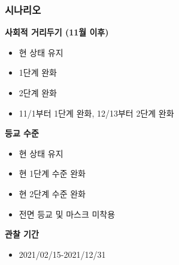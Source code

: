 \documentclass[aspectratio=169, 9pt, xcolor=dvipsnames]{beamer}
\begin{document}
	\begin{frame}\frametitle{시나리오}
		\textbf{사회적 거리두기 (11월 이후)}
	    \begin{itemize}
	    	\item 현 상태 유지
	    	\item 1단계 완화
	    	\item 2단계 완화
	    	\item 11/1부터 1단계 완화, 12/13부터 2단계 완화
	    \end{itemize}
	    \vspace{0.3cm}
	    \textbf{등교 수준}
	    \begin{itemize}
	    	\item 현 상태 유지
	    	\item 현 1단계 수준 완화
	    	\item 현 2단계 수준 완화
	    	\item 전면 등교 및 마스크 미착용
	    \end{itemize}
	    \vspace{0.3cm}
	    \textbf{관찰 기간}
	    \begin{itemize}
	    	\item 2021/02/15-2021/12/31
	    \end{itemize}
	\end{frame}
\end{document}
